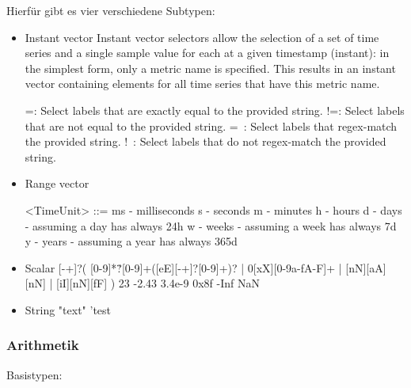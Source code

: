 Hierfür gibt es vier verschiedene Subtypen:
\begin{itemize}
	\item Instant vector
	Instant vector selectors allow the selection of a set of time series and a single sample value for each at a given timestamp (instant): in the simplest form, only a metric name is specified. This results in an instant vector containing elements for all time series that have this metric name.
	
	
	=: Select labels that are exactly equal to the provided string.
	!=: Select labels that are not equal to the provided string.
	=~: Select labels that regex-match the provided string.
	!~: Select labels that do not regex-match the provided string.
	
	
	
	\item Range vector
	
	<TimeUnit> ::=
	ms - milliseconds
	s - seconds
	m - minutes
	h - hours
	d - days - assuming a day has always 24h
	w - weeks - assuming a week has always 7d
	y - years - assuming a year has always 365d
	
	
	\item Scalar
	[-+]?(
	[0-9]*\.?[0-9]+([eE][-+]?[0-9]+)?
	| 0[xX][0-9a-fA-F]+
	| [nN][aA][nN]
	| [iI][nN][fF]
	)
	23
	-2.43
	3.4e-9
	0x8f
	-Inf
	NaN
	\item String
	"text"
	'test
\end{itemize}

\subsubsection{Arithmetik}

Basistypen:

